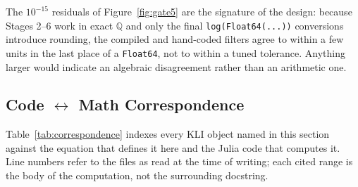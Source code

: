 \documentclass[11pt,leqno]{article}
\newcommand{\code}[1]{\texttt{#1}}
\theoremstyle{plain}
\theoremstyle{definition}
\begin{document}
The $10^{-15}$ residuals of Figure~\ref{fig:gate5} are the signature of the
design: because Stages 2--6 work in exact $\mathbb{Q}$ and only the final
\code{log(Float64(...))} conversions introduce rounding, the compiled and
hand-coded filters agree to within a few units in the last place of a
\code{Float64}, not to within a tuned tolerance.  Anything larger would
indicate an algebraic disagreement rather than an arithmetic one.

\subsection{Code \texorpdfstring{$\leftrightarrow$}{<->} Math Correspondence}

Table~\ref{tab:correspondence} indexes every KLI object named in this section
against the equation that defines it here and the Julia code that computes it.
Line numbers refer to the files as read at the time of writing; each cited
range is the body of the computation, not the surrounding docstring.
\end{document}
